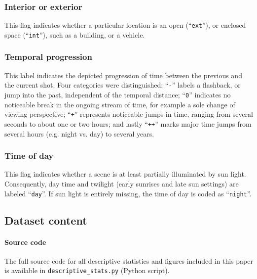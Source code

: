 \documentclass[10pt,a4paper,twocolumn]{article}
\begin{document}
\subsubsection*{Interior or exterior}

This flag indicates whether a particular location is an open
(``\texttt{ext}''), or enclosed space (``\texttt{int}''), such as a building,
or a vehicle.


\subsubsection*{Temporal progression}

This label indicates the depicted progression of time between the previous and
the current shot. Four categories were distinguished: ``\texttt{-}'' labels a
flashback, or jump into the past, independent of the temporal distance;
``\texttt{0}'' indicates no noticeable break in the ongoing stream of time, for
example a sole change of viewing perspective; ``\texttt{+}'' represents
noticeable jumps in time, ranging from several seconds to about one or two
hours; and lastly ``\texttt{++}'' marks major time jumps from several hours
(e.g.  night vs. day) to several years.


\subsubsection*{Time of day}

This flag indicates whether a scene is at least partially illuminated by sun
light. Consequently, day time and twilight (early sunrises and late sun
settings) are labeled ``\texttt{day}''. If sun light is entirely missing,
the time of day is coded as ``\texttt{night}''.



\subsection*{Dataset content}


\paragraph{Source code}

The full source code for all descriptive statistics and figures included in
this paper is available in \texttt{descriptive\_stats.py} (Python script).
\end{document}

